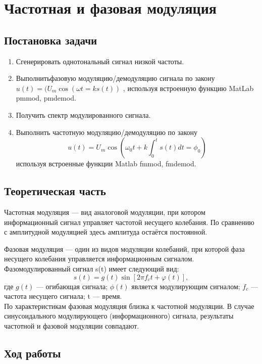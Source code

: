 \chapter{Частотная и фазовая модуляция}
\section{Постановка задачи}
\begin{enumerate}
\item 
Сгенерировать однотональный сигнал низкой частоты.
\item
Выполнитьфазовую модуляцию/демодуляцию сигнала по закону $u(t)=(U_m\cos(\omega t=ks(t))$ , используя встроенную функцию MatLab pmmod, pmdemod.
\item
Получить спектр модулированного сигнала.
\item
Выполнить частотную модуляцию/демодуляцию по закону 
\begin{equation}
u(t)=U_m\cos (\omega _0 t+k \int_0^t s(t)dt=\phi _0)
\end{equation}
используя встроенные функции Matlab fmmod, fmdemod.
\end{enumerate}
\section{Теоретическая часть}
Частотная модуляция — вид аналоговой модуляции, при котором информационный сигнал управляет частотой несущего колебания. По сравнению с амплитудной модуляцией здесь амплитуда остаётся постоянной.

Фазовая модуляция — один из видов модуляции колебаний, при которой фаза несущего колебания управляется информационным сигналом. Фазомодулированный сигнал s(t) имеет следующий вид:
\begin{equation} 
s(t) = g(t) \sin[2 \pi f_c t + \varphi(t)] ,
\end{equation}
где $g(t)$ — огибающая сигнала; $\phi(t)$ является модулирующим сигналом; $f_c$ — частота несущего сигнала; t — время.\\
По характеристикам фазовая модуляция близка к частотной модуляции. В случае синусоидального модулирующего (информационного) сигнала, результаты частотной и фазовой модуляции совпадают.
\section{Ход работы}
